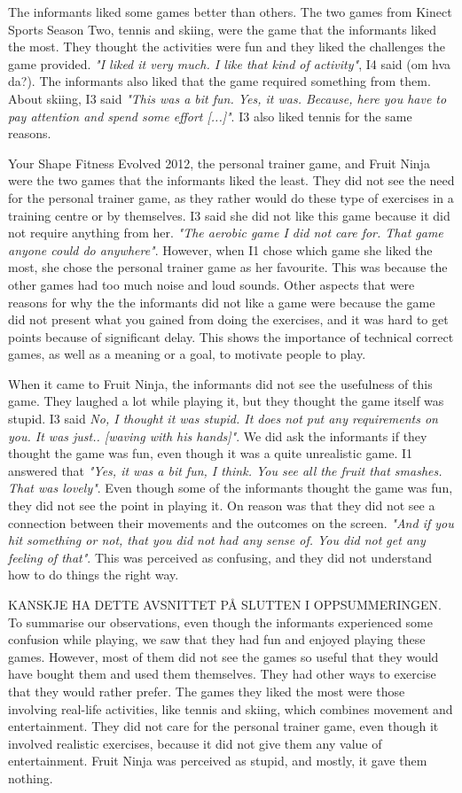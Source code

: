 The informants liked some games better than others. The two games from Kinect Sports Season Two, tennis and skiing, were the game that the informants liked the most. They thought the activities were fun and they liked the challenges the game provided. \emph{"I liked it very much. I like that kind of activity"}, I4 said (om hva da?). The informants also liked that the game required something from them. About skiing, I3 said \emph{"This was a bit fun. Yes, it was. Because, here you have to pay attention and spend some effort [...]"}. I3 also liked tennis for the same reasons.  

Your Shape Fitness Evolved 2012, the personal trainer game, and Fruit Ninja were the two games that the informants liked the least. They did not see the need for the personal trainer game, as they rather would do these type of exercises in a training centre or by themselves. I3 said she did not like this game because it did not require anything from her. \emph{"The aerobic game I did not care for. That game anyone could do anywhere"}. However, when I1 chose which game she liked the most, she chose the personal trainer game as her favourite. This was because the other games had too much noise and loud sounds. Other aspects that were reasons for why the the informants did not like a game were because the game did not present what you gained from doing the exercises, and it was hard to get points because of significant delay. This shows the importance of technical correct games, as well as a meaning or a goal, to motivate people to play. 

When it came to Fruit Ninja, the informants did not see the usefulness of this game. They laughed a lot while playing it, but they thought the game itself was stupid. I3 said \emph{No, I thought it was stupid. It does not put any requirements on you. It was just.. [waving with his hands]"}. We did ask the informants if they thought the game was fun, even though it was a quite unrealistic game. I1 answered that \emph{"Yes, it was a bit fun, I think. You see all the fruit that smashes. That was lovely"}. Even though some of the informants thought the game was fun, they did not see the point in playing it. On reason was that they did not see a connection between their movements and the outcomes on the screen. \emph{"And if you hit something or not, that you did not had any sense of. You did not get any feeling of that"}. This was perceived as confusing, and they did not understand how to do things the right way. 

KANSKJE HA DETTE AVSNITTET PÅ SLUTTEN I OPPSUMMERINGEN. 
To summarise our observations, even though the informants experienced some confusion while playing, we saw that they had fun and enjoyed playing these games. However, most of them did not see the games so useful that they would have bought them and used them themselves. They had other ways to exercise that they would rather prefer. The games they liked the most were those involving real-life activities, like tennis and skiing, which combines movement and entertainment. They did not care for the personal trainer game, even though it involved realistic exercises, because it did not give them any value of entertainment. Fruit Ninja was perceived as stupid, and mostly, it gave them nothing.   


